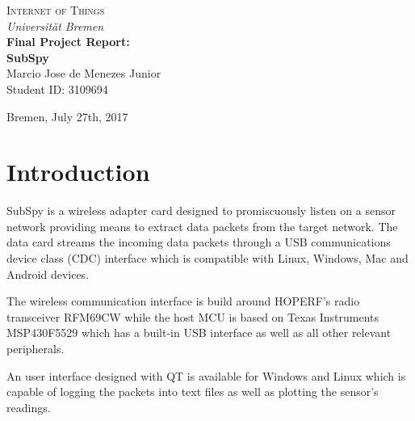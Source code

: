 \documentclass[12pt]{article}
\begin{document}
\begin{titlepage}
\begin{center}

\textsc{\LARGE Internet of Things} \\[0.5cm]

\emph{\LARGE Universit{\"a}t Bremen } \\[5cm]

{\huge \bfseries Final Project Report: \\ SubSpy} \\[3cm]

{\LARGE Marcio Jose de Menezes Junior }\\[0.5cm]

{\LARGE Student ID: 3109694}


\vfill

{\LARGE Bremen, July 27th, 2017}

\end{center}
\end{titlepage}


\newpage

\tableofcontents

\vfill
\newpage



\section{Introduction}

SubSpy is a wireless adapter card designed to promiscuously listen on a sensor network providing means to extract data packets from the target network. The data card streams the incoming data packets through a USB communications device class (CDC) interface which is compatible with Linux, Windows, Mac and Android devices.

The wireless communication interface is build around HOPERF's radio transceiver RFM69CW while the host MCU is based on Texas Instruments MSP430F5529 which has a built-in USB interface as well as all other relevant peripherals.

An user interface designed with QT is available for Windows and Linux which is capable of logging the packets into text files as well as plotting the sensor's readings.

\end{document}

